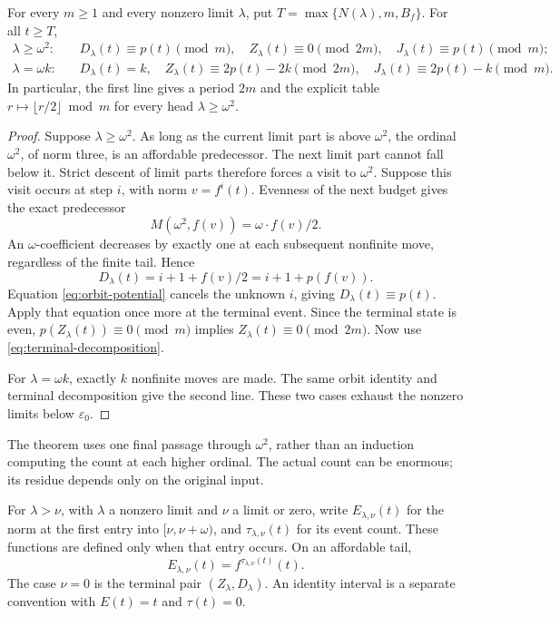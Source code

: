 \begin{theorem}\label{thm:counts}
For every \(m\ge1\) and every nonzero limit \(\lambda\), put
\(T=\max\{N(\lambda),m,B_f\}\).  For all \(t\ge T\),
\begin{align*}
 \lambda\ge\omega^2:\quad&
 D_\lambda(t)\equiv p(t)\pmod m,\quad
 Z_\lambda(t)\equiv0\pmod{2m},\quad
 J_\lambda(t)\equiv p(t)\pmod m;\\
 \lambda=\omega k:\quad&
 D_\lambda(t)=k,\quad
 Z_\lambda(t)\equiv2p(t)-2k\pmod{2m},\quad
 J_\lambda(t)\equiv2p(t)-k\pmod m.
\end{align*}
In particular, the first line gives a period \(2m\) and the explicit
table \(r\mapsto\lfloor r/2\rfloor\bmod m\) for every head
\(\lambda\ge\omega^2\).
\end{theorem}
\begin{proof}
Suppose \(\lambda\ge\omega^2\).  As long as the current limit part
is above \(\omega^2\), the ordinal \(\omega^2\), of norm three,
is an affordable predecessor.  The next limit part cannot fall below it.
Strict descent of limit parts therefore forces a visit to
\(\omega^2\).  Suppose this visit occurs at step \(i\), with norm
\(v=f^i(t)\).  Evenness of the next budget gives the exact predecessor
\[
 M(\omega^2,f(v))=\omega\cdot f(v)/2.
\]
An \(\omega\)-coefficient decreases by exactly one at each subsequent
nonfinite move, regardless of the finite tail.  Hence
\begin{equation}\label{eq:funnel-count}
 D_\lambda(t)=i+1+f(v)/2=i+1+p(f(v)).
\end{equation}
Equation \eqref{eq:orbit-potential} cancels the unknown \(i\), giving
\(D_\lambda(t)\equiv p(t)\).  Apply that equation once more at the
terminal event.  Since the terminal state is even,
\(p(Z_\lambda(t))\equiv0\pmod m\) implies
\(Z_\lambda(t)\equiv0\pmod{2m}\).  Now use
\eqref{eq:terminal-decomposition}.

For \(\lambda=\omega k\), exactly \(k\) nonfinite moves are made.
The same orbit identity and terminal decomposition give the second line.
These two cases exhaust the nonzero limits below \(\varepsilon_0\).
\end{proof}

The theorem uses one final passage through \(\omega^2\), rather than
an induction computing the count at each higher ordinal.  The actual
count can be enormous; its residue depends only on the original input.

For \(\lambda>\nu\), with \(\lambda\) a nonzero limit and
\(\nu\) a limit or zero, write \(E_{\lambda,\nu}(t)\) for the norm
at the first entry into \([\nu,\nu+\omega)\), and
\(\tau_{\lambda,\nu}(t)\) for its event count.  These functions
are defined only when that entry occurs.  On an affordable tail,
\begin{equation}\label{eq:entry-orbit}
 E_{\lambda,\nu}(t)=f^{\tau_{\lambda,\nu}(t)}(t).
\end{equation}
The case \(\nu=0\) is the terminal pair \((Z_\lambda,D_\lambda)\).
An identity interval is a separate convention with \(E(t)=t\) and
\(\tau(t)=0\).

